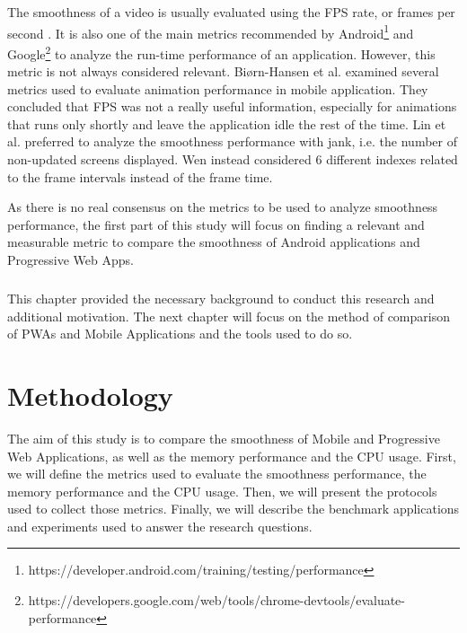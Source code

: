 \documentclass{kththesis}
\begin{document}
The smoothness of a video is usually evaluated using the FPS rate, or frames per second \cite{smooth_gui}. It is also one of the main metrics recommended by Android\footnote{https://developer.android.com/training/testing/performance} and Google\footnote{https://developers.google.com/web/tools/chrome-devtools/evaluate-performance} to analyze the run-time performance of an application.\newline
However, this metric is not always considered relevant. Biørn-Hansen et al. \cite{animation_performance} examined several metrics used to evaluate animation performance in mobile application. They concluded that FPS was not a really useful information, especially for animations that runs only shortly and leave the application idle the rest of the time. Lin et al.\cite{smooth_gui} preferred to 
analyze the smoothness performance with jank, i.e. the number of non-updated screens displayed. Wen \cite{smoothnessQoE} instead considered 6 different indexes related to the frame intervals instead of the frame time. 

As there is no real consensus on the metrics to be used to analyze smoothness performance,  the first part of this study will focus on finding a relevant and measurable metric to compare the smoothness of Android applications and Progressive Web Apps.

\paragraph{}
This chapter provided the necessary background to conduct this research and additional motivation. The next chapter will focus on the method of comparison of PWAs and Mobile Applications and the tools used to do so.
    
    
\chapter{Methodology}
\label{ch:methodology}

The aim of this study is to compare the smoothness of Mobile and Progressive Web Applications, as well as the memory performance and the CPU usage. First, we will define the metrics used to evaluate the smoothness performance, the memory performance and the CPU usage. Then, we will present the protocols used to collect those metrics. Finally, we will describe the benchmark applications and experiments used to answer the research questions. 

\end{document}
